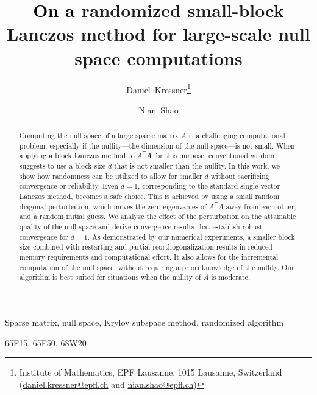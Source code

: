 \documentclass{siamart190516}
\newcommand{\edit}[1]{\textcolor{black}{#1}} %
\newcommand{\redit}[1]{\textcolor{black}{#1}} %
\begin{document}
    \title{{\redit{On a}} randomized small-block Lanczos method for large-scale null space computations
    }
    \author{
        Daniel~Kressner\thanks{Institute of Mathematics, EPF Lausanne, 1015 Lausanne, Switzerland (\href{mailto:daniel.kressner@epfl.ch}{daniel.kressner@epfl.ch} and \href{mailto:nian.shao@epfl.ch}{nian.shao@epfl.ch})}
        \and
        Nian~Shao\footnotemark[1]
        }
    \maketitle   
        \begin{abstract}	
 Computing the null space of a large sparse matrix $A$ is a challenging computational problem, especially if the nullity---the dimension of the null space---is \edit{not small}. When \redit{applying a block Lanczos method to $A^\mathsf{T} A$} for this purpose, conventional wisdom suggests to use a block size $d$ that is not smaller than the nullity. In this work, we show how randomness can be utilized to allow for smaller $d$ without sacrificing convergence or reliability. Even $d = 1$, corresponding to the standard single-vector Lanczos method, becomes a safe choice. This is achieved by using a small random diagonal perturbation, which moves the zero eigenvalues of $A^\mathsf{T} A$ away from each other, and a random initial guess. We analyze the effect of the perturbation on the attainable quality of the null space and derive convergence results that establish robust convergence for $d=1$. As demonstrated by our numerical experiments, a smaller block size combined with restarting and partial reorthogonalization results in reduced memory requirements and computational effort. It also allows for the incremental computation of the null space, without requiring a priori knowledge of the nullity. Our algorithm is best suited for situations when the nullity of $A$ is \redit{moderate}.
        \end{abstract}
        
        \begin{keywords}
            Sparse matrix, null space, Krylov subspace method, randomized algorithm
        \end{keywords} 
        \begin{AMS}
            65F15, 65F50, 68W20
        \end{AMS}
\maketitle
\end{document}
